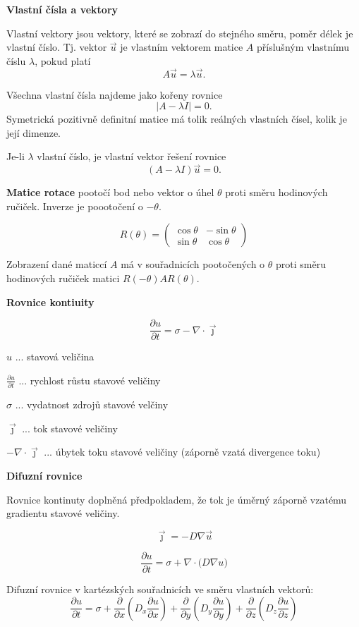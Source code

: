 \documentclass{article}
\begin{document}
\begin{multicols}{3}
\vfill\null

\columnbreak

\textbf{Vlastní čísla a vektory}

Vlastní vektory jsou vektory, které se zobrazí do stejného směru, poměr délek je vlastní číslo. Tj. vektor $\vec u$ je vlastním vektorem matice $A$ příslušným vlastnímu číslu $\lambda$, pokud platí $$A\vec u=\lambda\vec u.$$

Všechna vlastní čísla najdeme jako kořeny rovnice $$|A-\lambda I|=0.$$ Symetrická pozitivně definitní matice má tolik reálných vlastních čísel, kolik je její dimenze. 

Je-li $\lambda$ vlastní číslo, je vlastní vektor řešení rovnice $$(A-\lambda I)\vec u=0.$$

\textbf{Matice rotace} pootočí bod nebo vektor o úhel $\theta$ proti směru hodinových ručiček. Inverze je poootočení o $-\theta$.

$$R(\theta)=
\begin{pmatrix}
  \cos\theta & -\sin \theta\\
  \sin\theta & \cos\theta
\end{pmatrix}$$

Zobrazení dané maticcí $A$ má v souřadnicích pootočených o $\theta$ proti směru hodinových ručiček matici $R(-\theta)AR(\theta)$.

\vfill\null

\columnbreak

\textbf{Rovnice kontiuity}


$${\frac{\partial u}{\partial t}=\sigma -\nabla\cdot \vec \jmath}$$

$u$ ... stavová veličina

$\frac{\partial u}{\partial t}$ ... rychlost růstu stavové veličiny

$\sigma$ ... vydatnost zdrojů stavové velčiny

$\vec\jmath$ ... tok stavové veličiny

$-\nabla\cdot \vec \jmath$ ... úbytek toku stavové veličiny (záporně vzatá divergence toku)

\textbf{Difuzní rovnice}

Rovnice kontinuty doplněná předpokladem, že tok je úměrný záporně vzatému gradientu stavové veličiny.

$$\vec \jmath=-D\nabla \vec u$$

$${\frac{\partial u}{\partial t}=\sigma + \nabla\cdot \bigl(D\nabla u\bigr)}$$


Difuzní rovnice v kartézských souřadnicích ve směru vlastních vektorů:
$$\frac{\partial u}{\partial t}=\sigma +
  \frac{\partial}{\partial x}\left(D_x\frac{\partial u}{\partial x}\right)+
  \frac{\partial}{\partial y}\left(D_y\frac{\partial u}{\partial y}\right)+
  \frac{\partial}{\partial z}\left(D_z\frac{\partial u}{\partial z}\right)
  $$




\end{multicols}
\end{document}
